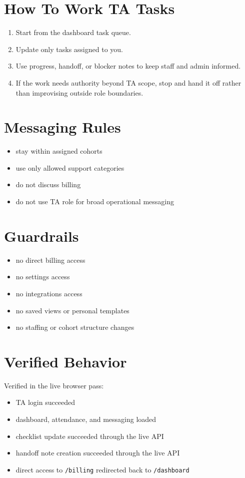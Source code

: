 \documentclass[11pt]{article}
\begin{document}
\section*{How To Work TA Tasks}
\begin{enumerate}
  \item Start from the dashboard task queue.
  \item Update only tasks assigned to you.
  \item Use progress, handoff, or blocker notes to keep staff and admin informed.
  \item If the work needs authority beyond TA scope, stop and hand it off rather than improvising outside role boundaries.
\end{enumerate}

\section*{Messaging Rules}
\begin{itemize}
  \item stay within assigned cohorts
  \item use only allowed support categories
  \item do not discuss billing
  \item do not use TA role for broad operational messaging
\end{itemize}

\section*{Guardrails}
\begin{itemize}
  \item no direct billing access
  \item no settings access
  \item no integrations access
  \item no saved views or personal templates
  \item no staffing or cohort structure changes
\end{itemize}

\section*{Verified Behavior}
Verified in the live browser pass:
\begin{itemize}
  \item TA login succeeded
  \item dashboard, attendance, and messaging loaded
  \item checklist update succeeded through the live API
  \item handoff note creation succeeded through the live API
  \item direct access to \texttt{/billing} redirected back to \texttt{/dashboard}
\end{itemize}
\end{document}
